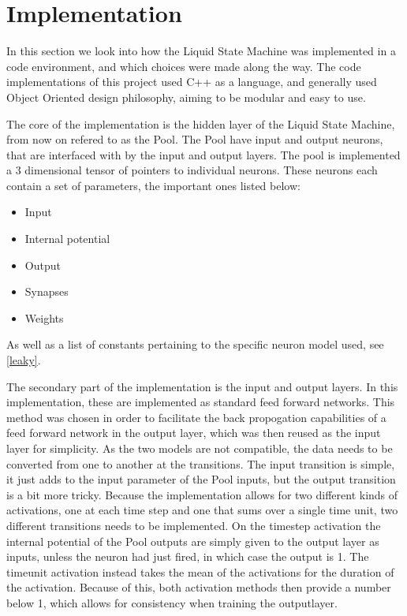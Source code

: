 \section{Implementation}

In this section we look into how the Liquid State Machine was implemented in a code environment, and which choices were made along the way.
The code implementations of this project used C++ as a language, and generally used Object Oriented design philosophy, aiming to be modular and easy to use.

The core of the implementation is the hidden layer of the Liquid State Machine, from now on refered to as the Pool. The Pool have input and output neurons, that are interfaced with by the input and output layers. %
The pool is implemented a 3 dimensional tensor of pointers to individual neurons. These neurons each contain a set of parameters, the important ones listed below:

\begin{itemize}
\item Input
\item Internal potential
\item Output
\item Synapses
\item Weights
\end{itemize}

As well as a list of constants pertaining to the specific neuron model used, see \ref{leaky}.

The secondary part of the implementation is the input and output layers. In this implementation, these are implemented as standard feed forward networks. This method was chosen in order to facilitate the back propogation capabilities of a feed forward network in the output layer, which was then reused as the input layer for simplicity. As the two models are not compatible, the data needs to be converted from one to another at the transitions. The input transition is simple, it just adds to the input parameter of the Pool inputs, but the output transition is a bit more tricky.
Because the implementation allows for two different kinds of activations, one at each time step and one that sums over a single time unit, two different transitions needs to be implemented.
On the timestep activation the internal potential of the Pool outputs are simply given to the output layer as inputs, unless the neuron had just fired, in which case the output is 1.
The timeunit activation instead takes the mean of the activations for the duration of the activation. Because of this, both activation methods then provide a number below 1, which allows for consistency when training the outputlayer.

